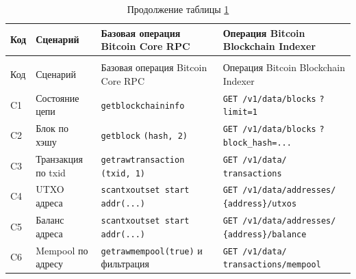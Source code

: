 \begin{footnotesize}
\setlength{\tabcolsep}{3pt}
\begin{longtable}{|p{}|p{}|p{}|p{}|}
    \caption{Сценарии испытаний производительности}\label{tab:performance-scenarios}\\ \hline
    Код & Сценарий & Базовая операция Bitcoin Core RPC & Операция Bitcoin Blockchain Indexer \\ \hline
    \endfirsthead
    \caption*{Продолжение таблицы \ref{tab:performance-scenarios}}\\ \hline
    Код & Сценарий & Базовая операция Bitcoin Core RPC & Операция Bitcoin Blockchain Indexer \\ \hline
    \endhead
    \hline
    \endfoot
    \hline
    \endlastfoot
    C1 & Состояние цепи &
    \texttt{getblockchaininfo} &
    \texttt{GET /v1/data/blocks}\newline
    \texttt{?limit=1} \\ \hline
    C2 & Блок по хэшу &
    \texttt{getblock}\newline
    \texttt{(hash, 2)} &
    \texttt{GET /v1/data/blocks}\newline
    \texttt{?block\_hash=...} \\ \hline
    C3 & Транзакция по txid &
    \texttt{getrawtransaction}\newline
    \texttt{(txid, 1)} &
    \texttt{GET /v1/data/}\newline
    \texttt{transactions} \\ \hline
    C4 & UTXO адреса &
    \texttt{scantxoutset start}\newline
    \texttt{addr(...)} &
    \texttt{GET /v1/data/addresses/}\newline
    \texttt{\{address\}/utxos} \\ \hline
    C5 & Баланс адреса &
    \texttt{scantxoutset start}\newline
    \texttt{addr(...)} &
    \texttt{GET /v1/data/addresses/}\newline
    \texttt{\{address\}/balance} \\ \hline
    C6 & Mempool по адресу &
    \texttt{getrawmempool(true)}\newline
    и фильтрация &
    \texttt{GET /v1/data/}\newline
    \texttt{transactions/mempool} \\ \hline
\end{longtable}
\end{footnotesize}

